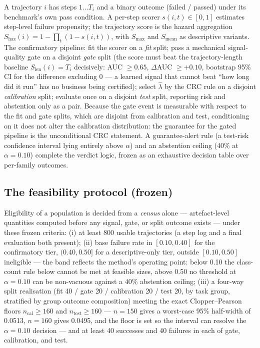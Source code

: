 \documentclass[11pt]{article}
\newcommand{\lamhat}{\hat{\lambda}}
\begin{document}
A trajectory $i$ has steps $1 \dots T_i$ and a binary outcome
(failed / passed) under its benchmark's own pass condition. A
per-step scorer $s(i, t) \in [0,1]$ estimates step-level failure
propensity; the trajectory score is the hazard aggregation
$S_{\mathrm{haz}}(i) = 1 - \prod_{t} (1 - s(i,t))$, with
$S_{\max}$ and $S_{\mathrm{mean}}$ as descriptive variants. The
confirmatory pipeline: fit the scorer on a \emph{fit} split;
pass a mechanical signal-quality gate on a disjoint \emph{gate}
split (the score must beat the trajectory-length baseline
$S_{\mathrm{len}}(i) = T_i$ decisively: AUC $\ge 0.65$,
$\Delta$AUC $\ge +0.10$, bootstrap 95\% CI for the difference
excluding 0 --- a learned signal that cannot beat ``how long
did it run'' has no business being certified); select $\lamhat$
by the CRC rule on a disjoint \emph{calibration} split; evaluate
once on a disjoint \emph{test} split, reporting risk and
abstention only as a pair. Because the gate event is measurable
with respect to the fit and gate splits, which are disjoint from
calibration and test, conditioning on it does not alter the
calibration distribution: the guarantee for the gated pipeline
is the unconditional CRC statement. A guarantee-alert rule (a
test-risk confidence interval lying entirely above $\alpha$) and
an abstention ceiling (40\% at $\alpha = 0.10$) complete the
verdict logic, frozen as an exhaustive decision table over
per-family outcomes.

\subsection{The feasibility protocol (frozen)}

Eligibility of a population is decided from a \emph{census}
alone --- artefact-level quantities computed before any signal,
gate, or split outcome exists --- under these frozen criteria:
(i) at least 800 usable trajectories (a step log and a final
evaluation both present); (ii) base failure rate in
$[0.10, 0.40]$ for the confirmatory tier, $(0.40, 0.50]$ for a
descriptive-only tier, outside $[0.10, 0.50]$ ineligible --- the
band reflects the method's operating point: below 0.10 the
class-count rule below cannot be met at feasible sizes, above
0.50 no threshold at $\alpha = 0.10$ can be non-vacuous against
a 40\% abstention ceiling; (iii) a four-way split realisation
(fit 40 / gate 20 / calibration 20 / test 20, by task group,
stratified by group outcome composition) meeting the exact
Clopper--Pearson floors $n_{\mathrm{cal}} \ge 160$ and
$n_{\mathrm{test}} \ge 160$ --- $n = 150$ gives a worst-case
95\% half-width of 0.0513, $n = 160$ gives 0.0495, and the floor
is set so the interval can resolve the $\alpha = 0.10$ decision
--- and at least 40 successes and 40 failures in each of gate,
calibration, and test.
\end{document}
